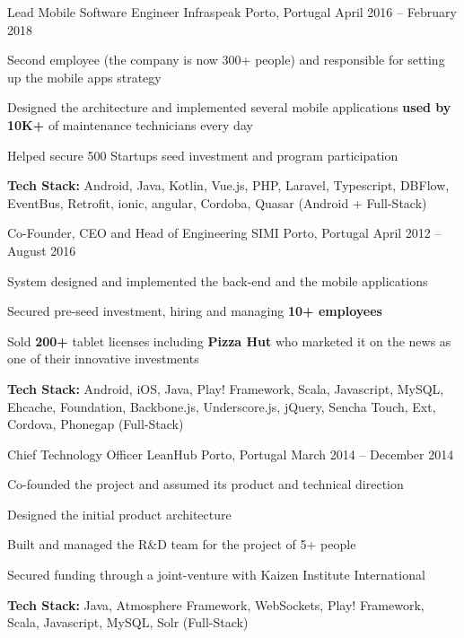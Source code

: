 \documentclass[]{awesome-cv}
\begin{document}
\begin{cventries}
	\vspace{-4mm}
	\cventry
	{Lead Mobile Software Engineer}
	{Infraspeak}
	{Porto, Portugal}
	{April 2016 – February 2018}
	{\begin{cvitems}
		\item {Second employee (the company is now 300+ people) and responsible for setting up the mobile apps strategy}
		\item {Designed the architecture and implemented several mobile applications \textbf{used by 10K+} of maintenance technicians every day}
		\item {Helped secure 500 Startups seed investment and program participation}
		\item {\textbf{Tech Stack:} Android, Java, Kotlin, Vue.js, PHP, Laravel, Typescript, DBFlow, EventBus, Retrofit, ionic, angular, Cordoba, Quasar (Android + Full-Stack)}
		\end{cvitems}}

	\vspace{-4mm}
	\cventry
	{Co-Founder, CEO and Head of Engineering}
	{SIMI}
	{Porto, Portugal}
	{April 2012 – August 2016}
	{\begin{cvitems}
		\item {System designed and implemented the back-end and the mobile applications}
		\item {Secured pre-seed investment, hiring and managing \textbf{10+ employees}}
		\item {Sold \textbf{200+} tablet licenses including \textbf{Pizza Hut} who marketed it on the news as one of their innovative investments}
		\item {\textbf{Tech Stack:} Android, iOS, Java, Play! Framework, Scala, Javascript, MySQL, Ehcache, Foundation, Backbone.js, Underscore.js, jQuery, Sencha Touch, Ext, Cordova, Phonegap (Full-Stack)}
		\end{cvitems}}

	\vspace{-4mm}
	\cventry
	{Chief Technology Officer}
	{LeanHub}
	{Porto, Portugal}
	{March 2014 – December 2014}
	{\begin{cvitems}
		\item {Co-founded the project and assumed its product and technical direction}
		\item {Designed the initial product architecture}
		\item {Built and managed the R\&D team for the project of 5+ people}
		\item {Secured funding through a joint-venture with Kaizen Institute International}
		\item {\textbf{Tech Stack:} Java, Atmosphere Framework, WebSockets, Play! Framework, Scala, Javascript, MySQL, Solr (Full-Stack)}
		\end{cvitems}}


\end{cventries}
\end{document}
